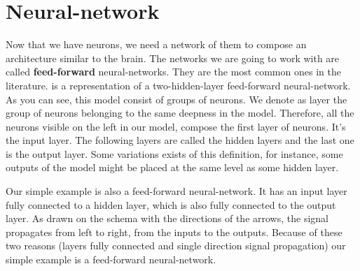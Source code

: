 	\section{Neural-network}
		Now that we have neurons, we need a network of them to compose an architecture similar to the brain. The networks we are going to work with are called \textbf{feed-forward} neural-networks. They are the most common ones in the literature.  is a representation of a two-hidden-layer feed-forward neural-network. As you can see, this model consist of groups of neurons. We denote as layer the group of neurons belonging to the same deepness in the model. Therefore, all the neurons visible on the left in our model, compose the first layer of neurons. It's the input layer. The following layers are called the hidden layers and the last one is the output layer. Some variations exists of this definition, for instance, some outputs of the model might be placed at the same level as some hidden layer.

		Our simple example is also a feed-forward neural-network. It has an input layer fully connected to a hidden layer, which is also fully connected to the output layer. As drawn on the schema with the directions of the arrows, the signal propagates from left to right, from the inputs to the outputs. Because of these two reasons (layers fully connected and single direction signal propagation) our simple example is a feed-forward neural-network.		

